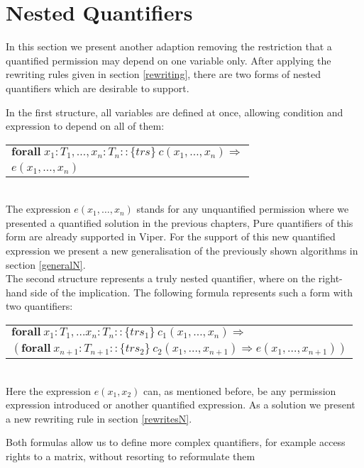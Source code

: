\documentclass[12pt]{article}
\begin{document}
\section{Nested Quantifiers}
In this section we present another adaption removing the restriction that a quantified permission may depend on one variable only. After applying the rewriting rules given in section \ref{rewriting}, there are two forms of nested quantifiers which are desirable to support.

In the first structure, all variables are defined at once, allowing condition and expression to depend on all of them:\\

\begin{tabularx}{1\textwidth}{ X }
	\( \mathbf{forall} \; x_1:T_1, \dots, x_n: T_n ::  \{trs\}\ c(x_1, \dots, x_n) \Rightarrow \) \\
	\(e(x_1,  \dots, x_n)\)
\end{tabularx}\\

The expression \(e(x_1,  \dots, x_n)\) stands for any unquantified permission where we presented a quantified solution in the previous chapters, Pure quantifiers of this form are already supported in Viper. For the support of this new quantified expression we present a new generalisation of the previously shown algorithms in section \ref{generalN}.\\

The second structure represents a truly nested quantifier, where on the right-hand side of the implication. The following formula represents such a form with two quantifiers:\\

\begin{tabularx}{1\textwidth}{ X}
      \(\mathbf{forall \ }  x_1:T_1, \dots x_n:T_n ::  \{trs_1\}\  c_1(x_1, \dots, x_n) \Rightarrow \) \\
     \( ( \mathbf{forall \ } x_{n+1}:T_{n+1} :: \{trs_2\} \ c_2(x_1, \dots, x_{n+1}) \Rightarrow e(x_1, \dots, x_{n+1}))\)
\end{tabularx}\\

Here the expression \(e(x_1, x_2)\) can, as mentioned before, be any permission expression introduced or another quantified expression. As a solution we present a new rewriting rule in section \ref{rewritesN}.

Both formulas allow us to define more complex quantifiers, for example access rights to a matrix, without resorting to reformulate them 
\end{document}

